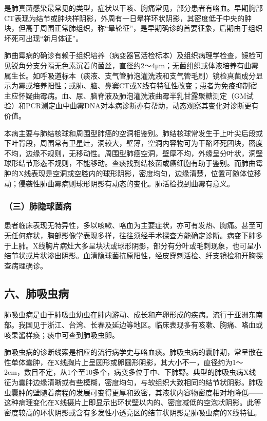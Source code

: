 是肺真菌感染最常见的类型，症状以干咳、胸痛常见，部分患者有咯血。早期胸部CT表现为结节或肿块样阴影，外周有一日晕样环状阴影，其密度低于中央的肿块，但高于周围正常肺组织，称“晕轮征”，是早期确诊的首要征象，后期由于组织坏死可出现“新月体征”。

肺曲霉病的确诊有赖于组织培养（病变器官活检标本）及组织病理学检查，镜检可见锐角分支分隔无色素沉着的菌丝，直径约2～4μm；无菌组织或体液培养有曲霉属生长。如呼吸道标本（痰液、支气管肺泡灌洗液和支气管毛刷）镜检真菌成分显示为霉或培养阳性；或肺、脑、鼻窦CT或X线有特征性改变；患者为免疫抑制宿主应怀疑曲霉病。血、尿、脑脊液及肺泡灌洗液曲霉半乳甘露聚糖测定（GM试验）和PCR测定血中曲霉DNA对本病诊断亦有帮助，动态观察其变化对诊断更有价值。

本病主要与肺结核球和周围型肺癌的空洞相鉴别。肺结核球常发生于上叶尖后段或下叶背段，周围常有卫星灶，洞较大，壁薄，空洞内容物可为干酪坏死团块，密度不均，边缘不规则，无移动性。周围型肺癌空洞，壁厚不均，外缘呈分叶状，洞壁球形结节形态不规则，不能移动。查痰找到结核菌或癌细胞有助于鉴别。而肺曲霉肿的X线表现是空洞或空腔内的球形阴影，密度均匀，边缘清楚，位置可随体位移动；侵袭性肺曲霉病则球形阴影有动态的变化。肺活检找到曲霉有意义。

\subsubsection{（三）肺隐球菌病}

患者临床表现无特异性，多以咳嗽、咯血为主要症状，亦可有发热、胸痛。甚至可无任何症状，胸部影像学表现多样，往往须经手术探查方能确定诊断。病变下肺多于上肺。X线胸片病灶大多呈块状或球形阴影，部分有分叶或毛刺现象，也可呈小结节状或片状渗出阴影。血清隐球菌抗原阳性，经皮穿刺活检、纤支镜检和开胸探查病理确诊。

\subsection{六、肺吸虫病}

肺吸虫病是由于肺吸虫幼虫在肺内游动、成长和产卵形成的疾病。流行于亚洲东南部。我国见于浙江、台湾、长春及延边等地区。临床表现多有咳嗽、胸痛、咯血或咳果酱样痰；痰中可查到肺吸虫卵。

肺吸虫病的诊断线索是相应的流行病学史与咯血痰。肺吸虫病的囊肿期，常呈散在性单体囊肿，在X线胸片上呈圆形或卵圆形阴影，其大小不一，直径约为1～2cm，数目不定，从1个至10多个，病变多位于中、下肺野。典型的肺吸虫病X线征为囊肿边缘清晰或有些模糊，密度均匀，与软组织大致相同的结节状阴影。肺吸虫囊肿的壁随着病程的发展可变得更厚和致密，其液状内容物密度相对地降低------这种病理变化在X线摄片上即显示出环状壁以内的、密度减低的空泡状阴影。此等密度较高的环状阴影或含有多发性小透亮区的结节状阴影是肺吸虫病的X线特征。


